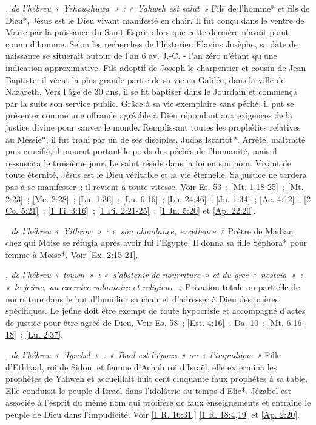 \begin{multicols}{2}
\textit{, de l'hébreu «~Yehowshuwa~»~: «~Yahweh est salut~»}\newline
Fils de l'homme* et fils de Dieu*, Jésus est le Dieu vivant manifesté en chair. Il fut conçu dans le ventre de Marie par la puissance du Saint-Esprit alors que cette dernière n'avait point connu d'homme. Selon les recherches de l'historien Flavius Josèphe, sa date de naissance se situerait autour de l'an 6 av. J.-C. - l'an zéro n'étant qu'une indication approximative. Fils adoptif de Joseph le charpentier et cousin de Jean Baptiste, il vécut la plus grande partie de sa vie en Galilée, dans la ville de Nazareth. Vers l'âge de 30 ans, il se fit baptiser dans le Jourdain et commença par la suite son service public. Grâce à sa vie exemplaire sans péché, il put se présenter comme une offrande agréable à Dieu répondant aux exigences de la justice divine pour sauver le monde. Remplissant toutes les prophéties relatives au Messie*, il fut trahi par un de ses disciples, Judas Iscariot*. Arrêté, maltraité puis crucifié, il mourut portant le poids des péchés de l'humanité, mais il ressuscita le troisième jour. Le salut réside dans la foi en son nom. Vivant de toute éternité, Jésus est le Dieu véritable et la vie éternelle. Sa justice ne tardera pas à se manifester~: il revient à toute vitesse.\newline
Voir Es. 53~; \vref{Mt. 1:18-25}~; \vref{Mt. 2:23}~; \vref{Mc. 2:28}~; \vref{Lu. 1:36}~; \vref{Lu. 6:16}~; \vref{Lu. 24:46}~; \vref{Jn. 1:34}~; \vref{Ac. 4:12}~; \vref{2 Co. 5:21}~; \vref{1 Ti. 3:16}~; \vref{1 Pi. 2:21-25}~; \vref{1 Jn. 5:20} et \vref{Ap. 22:20}.

\textit{, de l'hébreu «~Yithrow~»~: «~son abondance, excellence~»}\newline
Prêtre de Madian chez qui Moise se réfugia après avoir fui l'Egypte. Il donna sa fille Séphora* pour femme à Moïse*. Voir \vref{Ex. 2:15-21}.

\textit{, de l'hébreu «~tsuwn~»~: «~s'abstenir de nourriture~» et du grec «~nesteia~»~: «~le jeûne, un exercice volontaire et religieux~»}\newline
Privation totale ou partielle de nourriture dans le but d'humilier sa chair et d'adresser à Dieu des prières spécifiques. Le jeûne doit être exempt de toute hypocrisie et accompagné d'actes de justice pour être agréé de Dieu.\newline
Voir Es. 58~; \vref{Est. 4:16}~; Da. 10~; \vref{Mt. 6:16-18}~; \vref{Lu. 2:37}.

\textit{, de l'hébreu «~'Iyzebel~»~: «~Baal est l'époux~» ou «~l'impudique~»}\newline
Fille d'Ethbaal, roi de Sidon, et femme d'Achab roi d'Israël, elle extermina les prophètes de Yahweh et accueillait huit cent cinquante faux prophètes à sa table. Elle conduisit le peuple d'Israël dans l'idolâtrie au temps d'Elie*. Jézabel est associée à l'esprit du même nom qui prolifère de faux enseignements et entraîne le peuple de Dieu dans l'impudicité. Voir \vref{1 R. 16:31,} \vref{1 R. 18:4,19} et \vref{Ap. 2:20}.


\end{multicols}
